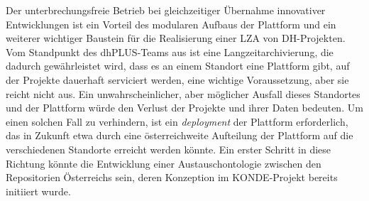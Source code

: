 \documentclass{article}
\begin{document}
        Der unterbrechungsfreie Betrieb bei gleichzeitiger Übernahme innovativer Entwicklungen ist ein Vorteil des modularen Aufbaus der Plattform und ein weiterer wichtiger Baustein für die Realisierung einer LZA von DH-Projekten. Vom Standpunkt des dhPLUS-Teams aus ist eine Langzeitarchivierung, die dadurch gewährleistet wird, dass es an einem Standort eine Plattform gibt, auf der Projekte dauerhaft serviciert werden, eine wichtige Voraussetzung, aber sie reicht nicht aus. Ein unwahrscheinlicher, aber möglicher Ausfall dieses Standortes und der Plattform würde den Verlust der Projekte und ihrer Daten bedeuten. Um einen solchen Fall zu verhindern, ist ein \emph{deployment} der Plattform erforderlich, das in Zukunft etwa durch eine österreichweite Aufteilung der Plattform auf die verschiedenen Standorte erreicht werden könnte. Ein erster Schritt in diese Richtung könnte die Entwicklung einer Austauschontologie zwischen den Repositorien Österreichs sein, deren Konzeption im KONDE-Projekt bereits initiiert wurde.\\
            
\end{document}

